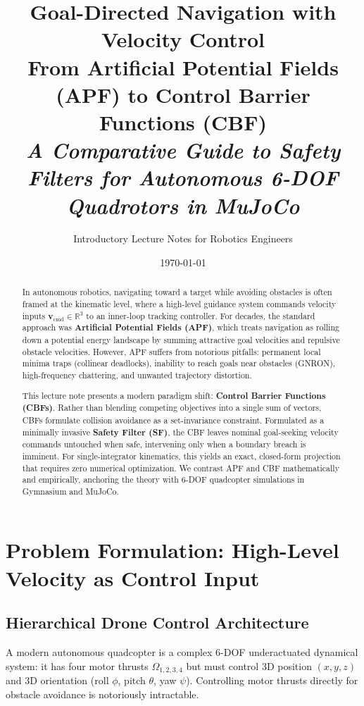 \documentclass[11pt,a4paper]{article}
\title{\textbf{\Huge Goal-Directed Navigation with Velocity Control}\\[0.5em]
\Large From Artificial Potential Fields (APF) to Control Barrier Functions (CBF)\\[0.3em]
\large \textit{A Comparative Guide to Safety Filters for Autonomous 6-DOF Quadrotors in MuJoCo}}
\author{Introductory Lecture Notes for Robotics Engineers}
\date{\today}
\begin{document}
\maketitle

\begin{abstract}
In autonomous robotics, navigating toward a target while avoiding obstacles is often framed at the kinematic level, where a high-level guidance system commands velocity inputs $\mathbf{v}_{\mathrm{cmd}} \in \mathbb{R}^3$ to an inner-loop tracking controller. For decades, the standard approach was \textbf{Artificial Potential Fields (APF)}, which treats navigation as rolling down a potential energy landscape by summing attractive goal velocities and repulsive obstacle velocities. However, APF suffers from notorious pitfalls: permanent local minima traps (collinear deadlocks), inability to reach goals near obstacles (GNRON), high-frequency chattering, and unwanted trajectory distortion.

This lecture note presents a modern paradigm shift: \textbf{Control Barrier Functions (CBFs)}. Rather than blending competing objectives into a single sum of vectors, CBFs formulate collision avoidance as a set-invariance constraint. Formulated as a minimally invasive \textbf{Safety Filter (SF)}, the CBF leaves nominal goal-seeking velocity commands untouched when safe, intervening only when a boundary breach is imminent. For single-integrator kinematics, this yields an exact, closed-form projection that requires zero numerical optimization. We contrast APF and CBF mathematically and empirically, anchoring the theory with 6-DOF quadcopter simulations in Gymnasium and MuJoCo.
\end{abstract}

\tableofcontents
\newpage

\section{Problem Formulation: High-Level Velocity as Control Input}

\subsection{Hierarchical Drone Control Architecture}
A modern autonomous quadcopter is a complex 6-DOF underactuated dynamical system: it has four motor thrusts $\Omega_{1,2,3,4}$ but must control 3D position $(x, y, z)$ and 3D orientation (roll $\phi$, pitch $\theta$, yaw $\psi$). Controlling motor thrusts directly for obstacle avoidance is notoriously intractable.
\end{document}
